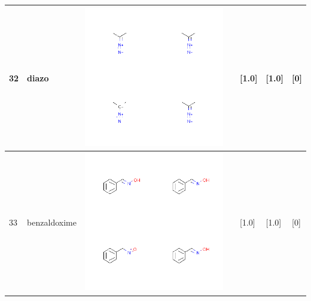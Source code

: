 \begin{longtable}{|l|l|l|l|l|l|l|}
\hline
32 & diazo & \includegraphics[scale=0.6]{diazoMV.png} & & [1.0]& [1.0] & [0] \\
\hline
33 & benzaldoxime & \includegraphics[scale=0.6]{benzaldoximeMV.png} & & [1.0]& [1.0] & [0] \\
\hline

\end{longtable}
